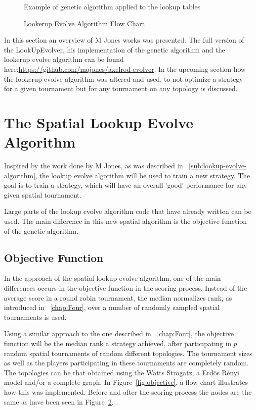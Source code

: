 \begin{figure}[H]
		
	\caption{Example of genetic algorithm applied to the lookup tables}
  \label{fig:example}
\end{figure}

\begin{figure}[H]
		
		\caption{Lookerup Evolve Algorithm Flow Chart}
  \label{fig:flookerup-evolve-flow}
\end{figure}

\newpage
In this section an overview of M Jones works was presented. The full version
of the LookUpEvolver, his implementation of the genetic algorithm and the lookerup evolve
algorithm can be found here:\url{https://github.com/mojones/axelrod-evolver}.
In the upcoming section how the lookerup evolve algorithm was altered and used,
to not optimize a strategy for a given tournament but for any tournament on
any topology is discussed.

\section{The Spatial Lookup Evolve Algorithm}

Inspired by the work done by M Jones, as was described in ~\autoref{sub:lookup-evolve-algorithm},
the lookup evolve algorithm will be used to train a new strategy. The goal is to
train a strategy, which will have an overall 'good' performance for any given
spatial tournament.

Large parts of the lookup evolve algorithm code that have already written
can be used. The main difference in this new spatial algorithm is the objective
function of the genetic algorithm.
\subsection{Objective Function}

In the approach of the spatial lookup evolve algorithm, one of the main differences
occurs in the objective function in the scoring process. Instead of the average
score in a round robin tournament, the median normalizes rank, as introduced
in ~\autoref{chap:Four}, over a number of randomly sampled spatial tournaments
is used.

Using a similar approach to the one described in ~\autoref{chap:Four}, the objective
function will be the median rank a strategy achieved, after participating in \(p\)
random spatial tournaments of random different topologies. The tournament sizes
as well as the players participating in these tournaments are completely random.
The topologies can be that obtained using the Watts Strogatz, a Erd\"{o}s
R\'{e}nyi model and/or a complete graph. In Figure~\ref{fig:objective}, a flow chart
illustrates how this was implemented. Before and after the scoring
process the nodes are the same as have been seen in Figure~\ref{fig:flookerup-evolve-flow}.

